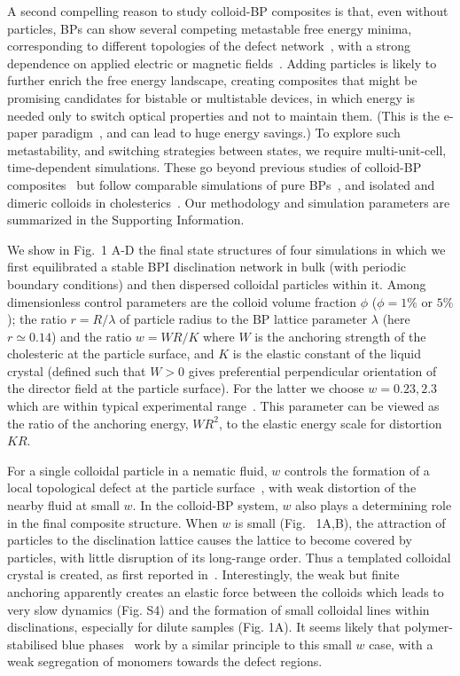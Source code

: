 \documentclass[12pt]{article}
\begin{document}
A second compelling reason to study colloid-BP composites is that, even without particles, BPs can show several competing metastable free energy minima,
corresponding to different topologies of the defect network~\cite{adriano}, with a strong dependence on applied electric or magnetic fields~\cite{henrichfield}.
% 
Adding particles is likely to further enrich the free energy landscape, creating composites that might be promising candidates for bistable or multistable devices, in which energy is needed only to switch optical properties and not to maintain them. (This is the e-paper paradigm~\cite{epaper}, and can lead to huge energy savings.)
To explore such metastability, and switching strategies between states, we require multi-unit-cell, time-dependent simulations. These go beyond previous studies of colloid-BP composites~\cite{miha} but follow comparable simulations of pure BPs~\cite{domaingrowth,bp3,henrichfield}, and isolated and dimeric colloids in cholesterics~\cite{juho1,juho2}. Our methodology and simulation parameters are summarized in the Supporting Information.

We show in Fig.~1 A-D the final state structures of four simulations in which we first equilibrated a stable BPI disclination network in bulk (with periodic boundary conditions) and then dispersed colloidal particles within it. Among dimensionless control parameters are the colloid volume fraction $\phi$  ($\phi = 1\%$ or $5\%$); the ratio $r = R/\lambda$ of particle radius to the BP lattice parameter $\lambda$ (here $r\simeq 0.14$) and the ratio $w = WR/K$ where $W$ is the anchoring strength of the cholesteric at the particle surface, and $K$ is the elastic constant of the liquid crystal (defined such that $W>0$ gives preferential perpendicular orientation of the director field at the particle surface). For the latter we choose $w = 0.23, 2.3$ which are within typical experimental range~\cite{tiffany}. This parameter can be viewed as the ratio of the anchoring energy, $WR^2$, to the elastic energy scale for distortion $KR$. 

For a single colloidal particle in a nematic fluid, $w$ controls the formation of a local topological defect at the particle surface~\cite{stark}, with weak distortion of the nearby fluid at small $w$. In the colloid-BP system, $w$ also plays a determining role in the final composite structure. When $w$ is small (Fig.~ 1A,B), the attraction of particles to the disclination lattice causes
 the lattice to become covered by particles, with little disruption of its
 long-range order. Thus a templated colloidal crystal is created, as first reported in~\cite{miha}. Interestingly, the weak but finite anchoring apparently creates an elastic force between the colloids which leads to very slow dynamics (Fig. S4) and the formation of small colloidal lines within disclinations, especially for dilute samples (Fig. 1A). It seems likely that polymer-stabilised  blue phases~\cite{kikuchi} work by a similar principle to this small $w$ case, with a weak segregation of monomers towards the defect regions.
\end{document}
